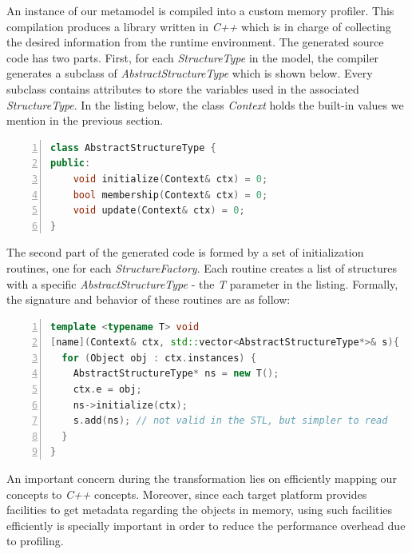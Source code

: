 {An instance of our metamodel is compiled into a custom memory profiler.
This compilation produces a library written in \textit{C++} which is in charge of collecting the desired information from the runtime environment.
The generated source code has two parts.
First, for each \textit{StructureType} in the model, the compiler generates a subclass of \textit{AbstractStructureType} which is shown below.
Every subclass contains attributes to store the variables used in the associated \textit{StructureType}.
In the listing below, the class \textit{Context} holds the built-in values we mention in the previous section.
\begin{lstlisting}[language=C++, frame=L,
numbers=left,
numberstyle=\color{black}\scriptsize,xleftmargin=2\parindent]
class AbstractStructureType {
public:
	void initialize(Context& ctx) = 0;
	bool membership(Context& ctx) = 0;
	void update(Context& ctx) = 0;
}
\end{lstlisting}

The second part of the generated code is formed by a set of initialization routines, one for each \textit{StructureFactory}.
Each routine creates a list of structures with a specific \textit{AbstractStructureType} - the \textit{T} parameter in the listing.
Formally, the signature and behavior of these routines are as follow:
\begin{lstlisting}[language=C++, frame=L,
numbers=left,
numberstyle=\color{black}\scriptsize,xleftmargin=2\parindent]
template <typename T> void
[name](Context& ctx, std::vector<AbstractStructureType*>& s){
  for (Object obj : ctx.instances) {
    AbstractStructureType* ns = new T();
    ctx.e = obj;
    ns->initialize(ctx);
    s.add(ns); // not valid in the STL, but simpler to read
  }
}
\end{lstlisting}
An important concern during the transformation lies on efficiently mapping our concepts to \textit{C++} concepts.
Moreover, since each target platform provides facilities to get metadata regarding the objects in memory, using such facilities efficiently is specially important in order to reduce the performance overhead due to profiling.

}
